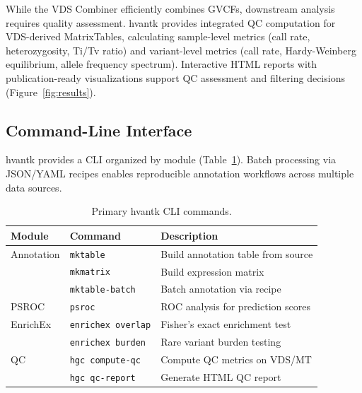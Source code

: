 \documentclass[11pt]{article}
\begin{document}
While the VDS Combiner efficiently combines GVCFs, downstream analysis requires quality assessment. hvantk provides integrated QC computation for VDS-derived MatrixTables, calculating sample-level metrics (call rate, heterozygosity, Ti/Tv ratio) and variant-level metrics (call rate, Hardy-Weinberg equilibrium, allele frequency spectrum). Interactive HTML reports with publication-ready visualizations support QC assessment and filtering decisions (Figure~\ref{fig:results}).

\subsection{Command-Line Interface}

hvantk provides a CLI organized by module (Table~\ref{tab:commands}). Batch processing via JSON/YAML recipes enables reproducible annotation workflows across multiple data sources.

\begin{table}[t]
\centering
\caption{Primary hvantk CLI commands.}
\label{tab:commands}
\begin{tabular}{@{}lll@{}}
\toprule
\textbf{Module} & \textbf{Command} & \textbf{Description} \\
\midrule
Annotation & \texttt{mktable} & Build annotation table from source \\
 & \texttt{mkmatrix} & Build expression matrix \\
 & \texttt{mktable-batch} & Batch annotation via recipe \\
\midrule
PSROC & \texttt{psroc} & ROC analysis for prediction scores \\
\midrule
EnrichEx & \texttt{enrichex overlap} & Fisher's exact enrichment test \\
 & \texttt{enrichex burden} & Rare variant burden testing \\
\midrule
QC & \texttt{hgc compute-qc} & Compute QC metrics on VDS/MT \\
 & \texttt{hgc qc-report} & Generate HTML QC report \\
\bottomrule
\end{tabular}
\end{table}
\end{document}
